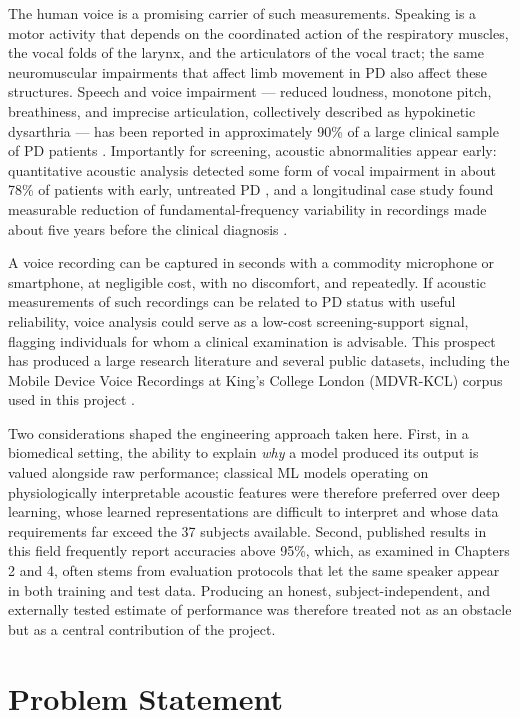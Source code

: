The human voice is a promising carrier of such measurements. Speaking is
a motor activity that depends on the coordinated action of the
respiratory muscles, the vocal folds of the larynx, and the
articulators of the vocal tract; the same neuromuscular impairments that
affect limb movement in PD also affect these structures. Speech and
voice impairment --- reduced loudness, monotone pitch, breathiness, and
imprecise articulation, collectively described as hypokinetic
dysarthria --- has been reported in approximately 90\% of a large
clinical sample of PD patients \cite{ho1999}. Importantly for
screening, acoustic abnormalities appear early: quantitative acoustic
analysis detected some form of vocal impairment in about 78\% of
patients with early, untreated PD \cite{rusz2011}, and a longitudinal
case study found measurable reduction of fundamental-frequency
variability in recordings made about five years before the clinical
diagnosis \cite{harel2004}.

A voice recording can be captured in seconds with a commodity
microphone or smartphone, at negligible cost, with no discomfort, and
repeatedly. If acoustic measurements of such recordings can be related
to PD status with useful reliability, voice analysis could serve as a
low-cost screening-support signal, flagging individuals for whom a
clinical examination is advisable. This prospect has produced a large
research literature and several public datasets, including the Mobile
Device Voice Recordings at King's College London (MDVR-KCL) corpus used
in this project \cite{jaeger2019}.

Two considerations shaped the engineering approach taken here. First,
in a biomedical setting, the ability to explain \emph{why} a model
produced its output is valued alongside raw performance; classical ML
models operating on physiologically interpretable acoustic features
were therefore preferred over deep learning, whose learned
representations are difficult to interpret and whose data requirements
far exceed the 37 subjects available. Second, published results in this
field frequently report accuracies above 95\%, which, as examined in
Chapters 2 and 4, often stems from evaluation protocols that let the
same speaker appear in both training and test data. Producing an
honest, subject-independent, and externally tested estimate of
performance was therefore treated not as an obstacle but as a central
contribution of the project.

\section{Problem Statement}


